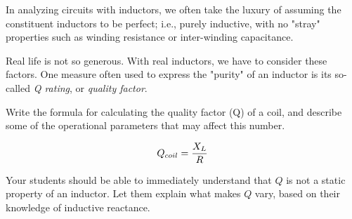 

In analyzing circuits with inductors, we often take the luxury of assuming the constituent inductors to be perfect; i.e., purely inductive, with no "stray" properties such as winding resistance or inter-winding capacitance.

Real life is not so generous.  With real inductors, we have to consider these factors.  One measure often used to express the "purity" of an inductor is its so-called {\it Q rating}, or {\it quality factor}.

Write the formula for calculating the quality factor (Q) of a coil, and describe some of the operational parameters that may affect this number.







$$Q_{coil} = {X_L \over R}$$







Your students should be able to immediately understand that $Q$ is not a static property of an inductor.  Let them explain what makes $Q$ vary, based on their knowledge of inductive reactance.




